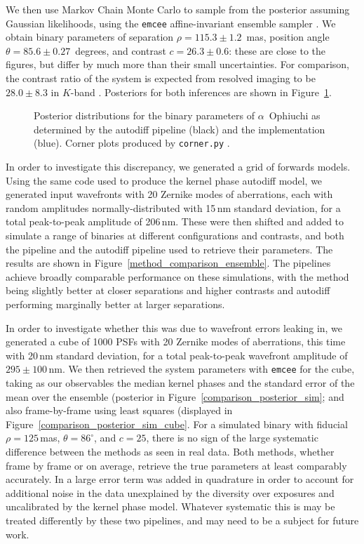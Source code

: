 \documentclass[modern]{aastex63}
\begin{document}
We then use Markov Chain Monte Carlo \citep{metropolis53} to sample from the posterior assuming Gaussian likelihoods, using the \texttt{emcee} affine-invariant ensemble sampler \citep{emcee}. We obtain binary parameters of separation $\rho = 115.3 \pm 1.2$~mas, position angle $\theta = 85.6 \pm 0.27$~degrees, and contrast $c = 26.3 \pm 0.6$: these are close to the \citet{martinache20} figures, but differ by much more than their small uncertainties. For comparison, the contrast ratio of the system is expected from resolved imaging to be $28.0 \pm 8.3$ in $K$-band \citep{hinkley11}. Posteriors for both inferences are shown in Figure~\ref{comparison_posterior}. 

\begin{figure}
\caption{Posterior distributions for the binary parameters of $\alpha$~Ophiuchi as determined by the autodiff pipeline (black) and the \citet{martinache20} implementation (blue). Corner plots produced by \texttt{corner.py} \citep{corner}. \label{comparison_posterior}}
\end{figure}

In order to investigate this discrepancy, we generated a grid of forwards models. Using the same code used to produce the kernel phase autodiff model, we generated input wavefronts with 20 Zernike modes of aberrations, each with random amplitudes normally-distributed with 15\,nm standard deviation, for a total peak-to-peak amplitude of 206\,nm. These were then shifted and added to simulate a range of binaries at different configurations and contrasts, and both the \citet{martinache20} pipeline and the autodiff pipeline used to retrieve their parameters. The results are shown in Figure~\ref{method_comparison_ensemble}. The pipelines achieve broadly comparable performance on these simulations, with the \citet{martinache20} method being slightly better at closer separations and higher contrasts and autodiff performing marginally better at larger separations. 

In order to investigate whether this was due to wavefront errors leaking in, we generated a cube of 1000 PSFs with 20 Zernike modes of aberrations, this time with 20\,nm standard deviation, for a total peak-to-peak wavefront amplitude of $295\pm 100$\,nm. We then retrieved the system parameters with \texttt{emcee} for the cube, taking as our observables the median kernel phases and the standard error of the mean over the ensemble (posterior in Figure~\ref{comparison_posterior_sim}; and also frame-by-frame using least squares (displayed in Figure~\ref{comparison_posterior_sim_cube}. For a simulated binary with fiducial $\rho = 125$\,mas, $\theta=86^\circ$, and $c = 25$, there is no sign of the large systematic difference between the methods as seen in real data. Both methods, whether frame by frame or on average, retrieve the true parameters at least comparably accurately. In \citet{martinache20} a large error term was added in quadrature in order to account for additional noise in the data unexplained by the diversity over exposures and uncalibrated by the kernel phase model. Whatever systematic this is may be treated differently by these two pipelines, and may need to be a subject for future work.
\end{document}
